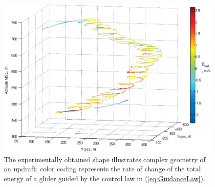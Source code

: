 \documentclass{ifacconf}
\begin{document}

\begin{figure}[thpb]
  \centering
  \includegraphics[scale=0.3]{Figures/BendedThermal.eps}
  \caption{The experimentally obtained shape illustrates complex geometry of an updraft; color coding represents the rate of change of the total energy of a glider guided by the control law in (\ref{eq:GuidanceLaw}).}
  \label{fig:ThermaShape}
\end{figure}
\end{document}

